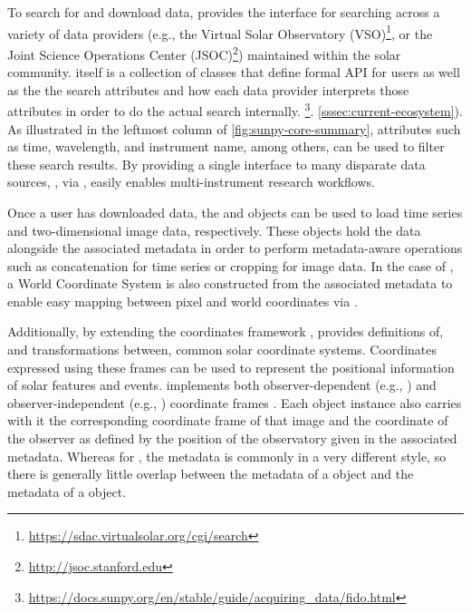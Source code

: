 To search for and download data, \sunpypkg provides the \Fido interface for searching across a variety of data providers (e.g., the Virtual Solar Observatory (VSO)\footnote{\url{https://sdac.virtualsolar.org/cgi/search}}, or the Joint Science Operations Center (JSOC)\footnote{\url{http://jsoc.stanford.edu}}) maintained within the solar community.
\Fido itself is a collection of classes that define formal API for users as well as the the search attributes and how each data provider interprets those attributes in order to do the actual search internally.
\footnote{\url{https://docs.sunpy.org/en/stable/guide/acquiring_data/fido.html}}.
 \citep{sunpy_community2020} 
 \autoref{sssec:current-ecosystem}).
As illustrated in the leftmost column of \autoref{fig:sunpy-core-summary}, attributes such as time, wavelength, and instrument name, among others, can be used to filter these search results.
By providing a single interface to many disparate data sources, \sunpypkg, via \Fido, easily enables multi-instrument research workflows.

Once a user has downloaded data, the  and  objects can be used to load time series and two-dimensional image data, respectively.
These objects hold the data alongside the associated metadata in order to perform metadata-aware operations such as concatenation for time series or cropping for image data.
In the case of , a World Coordinate System \citep[WCS, e.g.,][]{greisen_representations_2002} is also constructed from the associated metadata to enable easy mapping between pixel and world coordinates via \astropypkg.

Additionally, by extending the \astropypkg coordinates framework \citep[see Section 3.3 of][for more details]{the_astropy_collaboration_astropy_2018}, \sunpypkg provides definitions of, and transformations between, common solar coordinate systems.
Coordinates expressed using these frames can be used to represent the positional information of solar features and events. \sunpypkg implements both observer-dependent (e.g., \hpc) and observer-independent (e.g., \hgs) coordinate frames \citep{thompson_coordinate_2006}.
Each  object instance also carries with it the corresponding coordinate frame of that image and the coordinate of the observer as defined by the position of the observatory given in the associated metadata.
Whereas for , the metadata is commonly in a very different style, so there is generally little overlap between the metadata of a  object and the metadata of a  object.

